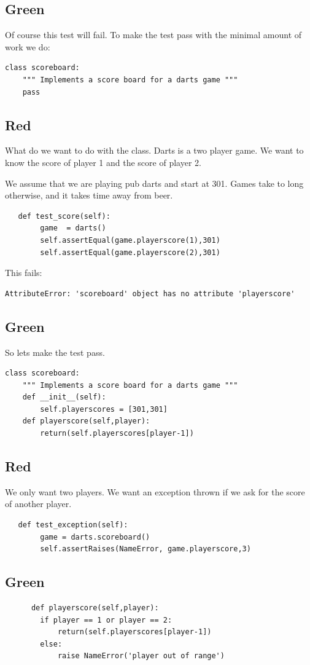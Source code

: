 \documentclass{paper}
\begin{document}
\subsection{Green}
Of course this test will fail. To make the test pass with the minimal
amount of work we do:
\begin{lstlisting}
class scoreboard:
    """ Implements a score board for a darts game """
    pass
\end{lstlisting}
\subsection{Red}
What do we want to do with the class. Darts is a two player game. We
want to know the score of player 1 and the score of player 2.

We assume that we are playing pub darts and start at 301. Games take
to long otherwise, and it takes time away from beer.

\begin{lstlisting}
   def test_score(self):
        game  = darts()
        self.assertEqual(game.playerscore(1),301)
        self.assertEqual(game.playerscore(2),301)
\end{lstlisting}
This fails:
\begin{verbatim}
AttributeError: 'scoreboard' object has no attribute 'playerscore'
\end{verbatim}
\subsection{Green}
So lets make the test pass.
\begin{lstlisting}
class scoreboard:
    """ Implements a score board for a darts game """
    def __init__(self):
        self.playerscores = [301,301]
    def playerscore(self,player):
        return(self.playerscores[player-1])
\end{lstlisting}
\subsection{Red}
We only want two players. We want an exception thrown if we ask for
the score of another player.
\begin{lstlisting}
   def test_exception(self):
        game = darts.scoreboard()
        self.assertRaises(NameError, game.playerscore,3)
\end{lstlisting}
\subsection{Green}
\begin{lstlisting}
      def playerscore(self,player):
        if player == 1 or player == 2:
            return(self.playerscores[player-1])
        else:
            raise NameError('player out of range')

\end{lstlisting}
\end{document}
